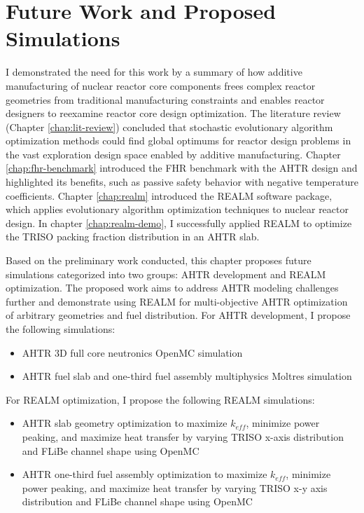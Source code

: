 \chapter{Future Work and Proposed Simulations}

I demonstrated the need for this work by a summary of how additive manufacturing 
of nuclear reactor core components frees complex reactor geometries from 
traditional manufacturing constraints and enables reactor designers to reexamine 
reactor core design optimization.
The literature review (Chapter \ref{chap:lit-review}) concluded that stochastic 
evolutionary algorithm optimization methods could find global 
optimums for reactor design problems in the vast exploration design space 
enabled by additive manufacturing. 
Chapter \ref{chap:fhr-benchmark} introduced the \acrfull{FHR} benchmark with 
the \gls{AHTR} design and highlighted its benefits, such as passive safety 
behavior with negative temperature coefficients. 
Chapter \ref{chap:realm} introduced the \acrfull{REALM} software package, 
which applies evolutionary algorithm optimization techniques to nuclear 
reactor design. 
In chapter \ref{chap:realm-demo}, I successfully applied \gls{REALM} 
to optimize the \gls{TRISO} packing fraction distribution in an \gls{AHTR} slab. 

Based on the preliminary work conducted, this chapter proposes 
future simulations categorized into two groups: \gls{AHTR} development and 
\gls{REALM} optimization. 
The proposed work aims to address \gls{AHTR} modeling challenges further and 
demonstrate using \gls{REALM} for multi-objective \gls{AHTR} 
optimization of arbitrary geometries and fuel distribution. 
For \gls{AHTR} development, I propose the following simulations: 
\begin{itemize}
    \item \gls{AHTR} 3D full core neutronics OpenMC simulation
    \item \gls{AHTR} fuel slab and one-third fuel assembly multiphysics 
    Moltres simulation
\end{itemize}
For \gls{REALM} optimization, I propose the following \gls{REALM} simulations: 
\begin{itemize}
    \item \gls{AHTR} slab geometry optimization to maximize $k_{eff}$, 
    minimize power peaking, and maximize heat transfer by varying \gls{TRISO} 
    x-axis distribution and \gls{FLiBe} channel shape using OpenMC
    \item \gls{AHTR} one-third fuel assembly optimization to maximize $k_{eff}$, 
    minimize power peaking, and maximize heat transfer by varying \gls{TRISO} 
    x-y axis distribution and \gls{FLiBe} channel shape using OpenMC
\end{itemize}

